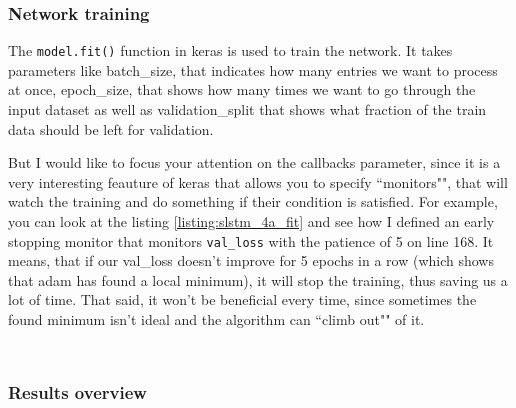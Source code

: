 \documentclass[12pt, a4paper]{article}
\begin{document}
\bgroup
  \inputminted[linenos, breaklines=true, fontsize=\scriptsize, firstnumber=last]{python}{src/stocks/lstm/3a_onelayer.py}
  \label{listing:slstm_3a_onelayer}
\egroup

\bgroup
  \inputminted[linenos, breaklines=true, fontsize=\scriptsize, firstnumber=last]{python}{src/stocks/lstm/3b_twolayer.py}
  \label{listing:slstm_3b_twolayer}
\egroup

\subsubsection{Network training}

The \texttt{model.fit()} function in keras is used to train the network. It takes parameters like batch\_size, that indicates how many entries we want to process at once, epoch\_size, that shows how many times we want to go through the input dataset as well as validation\_split that shows what fraction of the train data should be left for validation.

But I would like to focus your attention on the callbacks parameter, since it is a very interesting feauture of keras that allows you to specify ``monitors"", that will watch the training and do something if their condition is satisfied. For example, you can look at the listing \ref{listing:slstm_4a_fit} and see how I defined an early stopping monitor that monitors \texttt{val\_loss} with the patience of 5 on line 168. It means, that if our val\_loss doesn't improve for 5 epochs in a row (which shows that adam has found a local minimum), it will stop the training, thus saving us a lot of time. That said, it won't be beneficial every time, since sometimes the found minimum isn't ideal and the algorithm can ``climb out"" of it.

\bgroup
  \inputminted[linenos, breaklines=true, fontsize=\scriptsize, firstnumber=last]{python}{src/stocks/lstm/4b_plot.py}
  \label{listing:slstm_4b_plot}
\egroup

\bgroup
  \inputminted[linenos, breaklines=true, fontsize=\scriptsize, firstnumber=last]{python}{src/stocks/lstm/4a_fit.py}
  \label{listing:slstm_4a_fit}
\egroup

\subsubsection{Results overview}
\end{document}
